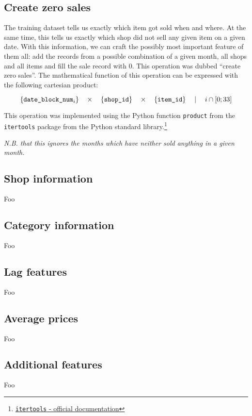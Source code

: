 \subsection{Create zero sales}

The training dataset tells us exactly which item got sold when and where. At the same time, this tells us exactly which shop did not sell any given item on a given date.
With this information, we can craft the possibly most important feature of them all: add the records from a possible combination of a given month, all shops and all items and fill the sale record with 0. This operation was dubbed \enquote{create zero sales}.
The mathematical function of this operation can be expressed with the following cartesian product:

\vspace*{-4mm}
$$
\{\text{\texttt{date\_block\_num}}_i\}
\quad \times \quad
\{{\text{\texttt{shop\_id}}}\}
\quad  \times \quad 
\{{\text{\texttt{item\_id}}}\}
\quad \mid \quad
i \cap [0; 33]
$$

This operation was implemented using the Python function \texttt{product} from the \texttt{itertools} package from the Python standard library.\footnote{\href{https://docs.python.org/3/library/itertools.html\#itertools.product}{\texttt{itertools} - official documentation}}

\noindent \textit{N.B. that this ignores the months which have neither sold anything in a given month.}

\subsection{Shop information}

Foo

\subsection{Category information}

Foo

\subsection{Lag features}

Foo

\subsection{Average prices}

Foo

\subsection{Additional features}

Foo
